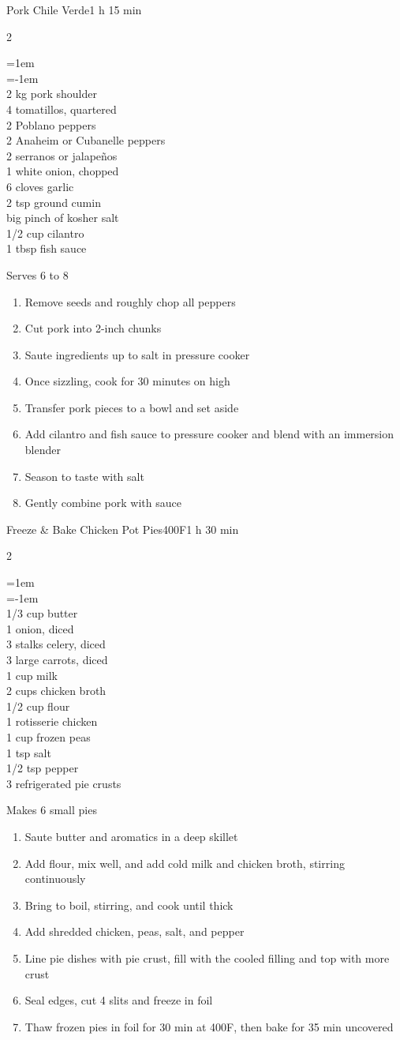 \documentclass{article}
\newenvironment{recipe}[3][]
    {\begin{cardbase}[#1]{#2}{#3}
    \columnratio{0.333}
    \begin{paracol}{2}}
    {\end{paracol}\end{cardbase}}
\newenvironment{denserecipe}[3][]
    {\small
    \begin{recipe}[#1]{#2}{#3}}
    {\end{recipe}}
\newcommand{\nextcolumn}{\switchcolumn}
\newenvironment{ingredients}
    {
    \begin{obeylines}
    \vspace{\parskip}
    \setlength{\parskip}{0.25em}
    \vspace{-0.25em}
    \leftskip=1em
    \parindent=-1em}
    {\end{obeylines}}
\newenvironment{steps}
    {\begin{enumerate}[leftmargin=*,topsep=0pt]}
    {\end{enumerate}}
\newcommand{\fahrenheit}[1]{#1\textdegree{}F}
\newcommand{\tag}[1]{\hspace{1em}#1}
\newcommand{\symboltag}[2]{\tag{#1\hspace{0.4em}#2}}
\newcommand{\totaltime}[1]{\symboltag{\raisebox{-0.1em}{\small\StopWatchEnd}}{#1}}
\newcommand{\preheat}[1]{\symboltag{\Topbottomheat}{#1}}
\begin{document}
\begin{denserecipe}{Pork Chile Verde}{\totaltime{1 h 15 min}}
\begin{ingredients}
2 kg pork shoulder
4 tomatillos, quartered
2 Poblano peppers
2 Anaheim or Cubanelle peppers
2 serranos or jalapeños
1 white onion, chopped
6 cloves garlic
2 tsp ground cumin
big pinch of kosher salt
1/2 cup cilantro
1 tbsp fish sauce
\end{ingredients}
\nextcolumn
Serves 6 to 8
\begin{steps}
    \item Remove seeds and roughly chop all peppers
    \item Cut pork into 2-inch chunks
    \item Saute ingredients up to salt in pressure cooker
    \item Once sizzling, cook for 30 minutes on high
    \item Transfer pork pieces to a bowl and set aside
    \item Add cilantro and fish sauce to pressure cooker and blend with an immersion blender
    \item Season to taste with salt
    \item Gently combine pork with sauce
\end{steps}
\end{denserecipe}

\begin{denserecipe}{Freeze \& Bake Chicken Pot Pies}{\preheat{\fahrenheit{400}}\totaltime{1 h 30 min}}
\begin{ingredients}
1/3 cup butter
1 onion, diced
3 stalks celery, diced
3 large carrots, diced
1 cup milk
2 cups chicken broth
1/2 cup flour
1 rotisserie chicken
1 cup frozen peas
1 tsp salt
1/2 tsp pepper
3 refrigerated pie crusts
\end{ingredients}
\nextcolumn
Makes 6 small pies
\begin{steps}
    \item Saute butter and aromatics in a deep skillet
    \item Add flour, mix well, and add cold milk and chicken broth, stirring continuously
    \item Bring to boil, stirring, and cook until thick
    \item Add shredded chicken, peas, salt, and pepper
    \item Line pie dishes with pie crust, fill with the cooled filling and top with more crust
    \item Seal edges, cut 4 slits and freeze in foil
    \item Thaw frozen pies in foil for 30 min at \fahrenheit{400}, then bake for 35 min uncovered
\end{steps}
\end{denserecipe}
\end{document}
